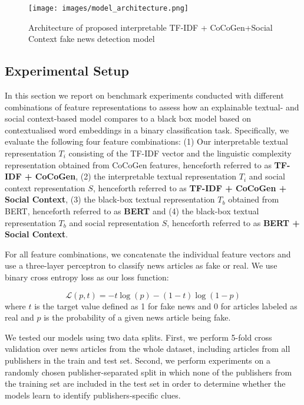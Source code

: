 \documentclass[11pt]{article}
\begin{document}
\begin{figure*}[t]
\centering
\texttt{[image: images/model\_architecture.png]}
\caption{Architecture of proposed interpretable TF-IDF + CoCoGen+Social Context fake news detection model}
\label{fig:components}
\end{figure*}

\subsection{Experimental Setup}


In this section we report on benchmark experiments conducted with different combinations of feature representations to assess how an explainable textual- and social context-based model compares to a black box model based on contextualised word embeddings in a binary classification task. Specifically, we evaluate the following four feature combinations: (1) Our interpretable textual representation \(T_i\) consisting of the TF-IDF vector and the linguistic complexity representation obtained from CoCoGen features, henceforth referred to as \textbf{TF-IDF + CoCoGen}, (2) the interpretable textual representation \(T_i\) and social context representation \(S\), henceforth referred to as \textbf{TF-IDF + CoCoGen + Social Context}, (3) the black-box textual representation \(T_b\) obtained from BERT, henceforth referred to as \textbf{BERT} and (4) the black-box textual representation \(T_b\) and social representation \(S\), henceforth referred to as \textbf{BERT + Social Context}.  

For all feature combinations, we concatenate the individual feature vectors and use a three-layer perceptron to classify news articles as fake or real. We use binary cross entropy loss as our loss function:

\[\mathcal{L}(p,t) = -t\log(p)-(1-t)\log(1-p) \]
where \(t\) is the target value defined as 1 for fake news and 0 for articles labeled as real and \(p\) is the probability of a given news article being fake. 

We tested our models using two data splits. First, we perform 5-fold cross validation over news articles from the whole dataset, including articles from all publishers in the train and test set. Second, we perform experiments on a randomly chosen publisher-separated split in which none of the publishers from the training set are included in the test set in order to determine whether the models learn to identify publishers-specific clues.
\end{document}
